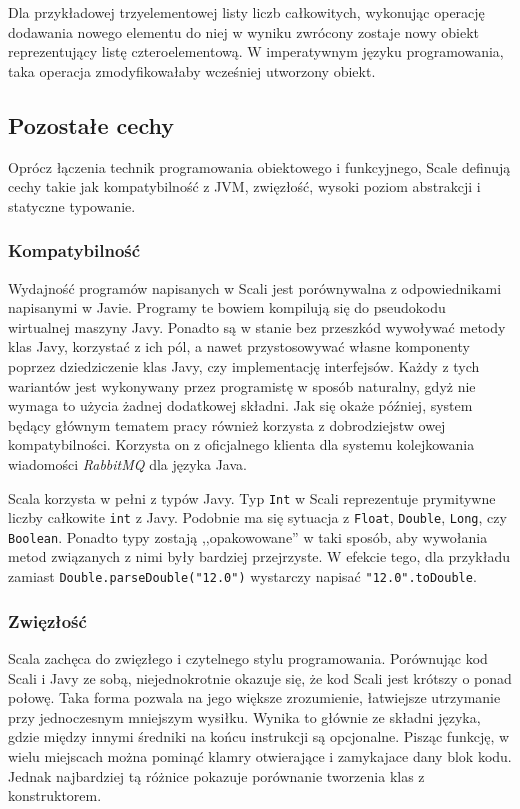 \documentclass[brudnopis]{xmgr}
\begin{document}
Dla przykładowej trzyelementowej listy liczb całkowitych, wykonując operację dodawania nowego elementu do niej w wyniku zwrócony zostaje nowy obiekt reprezentujący listę czteroelementową. W imperatywnym języku programowania, taka operacja zmodyfikowałaby wcześniej utworzony obiekt. 

\subsection{Pozostałe cechy}

Oprócz łączenia technik programowania obiektowego i funkcyjnego, Scale definują cechy takie jak kompatybilność z JVM, zwięzłość, wysoki poziom abstrakcji i statyczne typowanie. 

\subsubsection{Kompatybilność}

Wydajność programów napisanych w Scali jest porównywalna z odpowiednikami napisanymi w Javie. Programy te bowiem kompilują się do pseudokodu wirtualnej maszyny Javy. Ponadto są w stanie bez przeszkód wywoływać metody klas Javy, korzystać z ich pól, a nawet przystosowywać własne komponenty poprzez dziedziczenie klas Javy, czy implementację interfejsów. Każdy z tych wariantów jest wykonywany przez programistę w sposób naturalny, gdyż nie wymaga to użycia żadnej dodatkowej składni. Jak się okaże później, system będący głównym tematem pracy również korzysta z dobrodziejstw owej kompatybilności. Korzysta on z oficjalnego klienta dla systemu kolejkowania wiadomości \emph{RabbitMQ} dla języka Java.

Scala korzysta w pełni z typów Javy. Typ \texttt{Int} w Scali reprezentuje prymitywne liczby całkowite \texttt{int} z Javy. Podobnie ma się sytuacja z \texttt{Float}, \texttt{Double}, \texttt{Long}, czy \texttt{Boolean}. Ponadto typy zostają ,,opakowowane'' w taki sposób, aby wywołania metod związanych z nimi były bardziej przejrzyste. W efekcie tego, dla przykładu zamiast \texttt{Double.parseDouble("12.0")} wystarczy napisać \texttt{"12.0".toDouble}.

\subsubsection{Zwięzłość}

Scala zachęca do zwięzłego i czytelnego stylu programowania. Porównując kod Scali i Javy ze sobą, niejednokrotnie okazuje się, że kod Scali jest krótszy o ponad połowę. Taka forma pozwala na jego większe zrozumienie, łatwiejsze utrzymanie przy jednoczesnym mniejszym wysiłku. Wynika to głównie ze składni języka, gdzie między innymi średniki na końcu instrukcji są opcjonalne. Pisząc funkcję, w wielu miejscach można pominąć klamry otwierające i zamykajace dany blok kodu. Jednak najbardziej tą różnice pokazuje porównanie tworzenia klas z konstruktorem.
\end{document}
